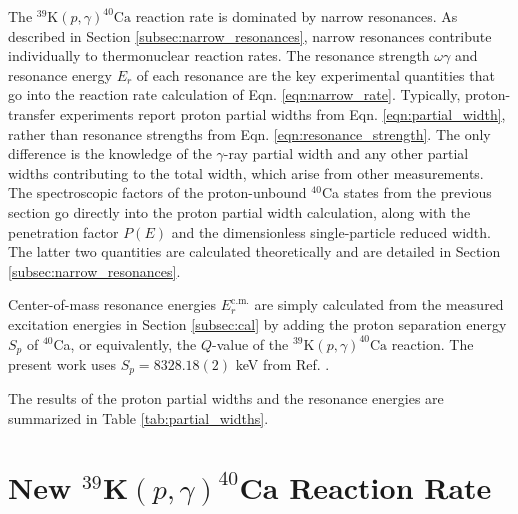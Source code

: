 
The $^{39}\mathrm{K}(p,\gamma)^{40}\mathrm{Ca}$ reaction rate is dominated by narrow resonances. As described in Section \ref{subsec:narrow_resonances}, narrow resonances contribute individually to thermonuclear reaction rates. The resonance strength $\omega\gamma$ and resonance energy $E_{r}$ of each resonance are the key experimental quantities that go into the reaction rate calculation of Eqn. \ref{eqn:narrow_rate}. Typically, proton-transfer experiments report proton partial widths from Eqn. \ref{eqn:partial_width}, rather than resonance strengths from Eqn. \ref{eqn:resonance_strength}. The only difference is the knowledge of the $\gamma$-ray partial width and any other partial widths contributing to the total width, which arise from other measurements. The spectroscopic factors of the proton-unbound $^{40}$Ca states from the previous section go directly into the proton partial width calculation, along with the penetration factor $P(E)$ and the dimensionless single-particle reduced width. The latter two quantities are calculated theoretically and are detailed in Section \ref{subsec:narrow_resonances}.

Center-of-mass resonance energies $E_{r}^{\mathrm{c.m.}}$ are simply calculated from the measured excitation energies in Section \ref{subsec:cal} by adding the proton separation energy $S_{p}$ of $^{40}$Ca, or equivalently, the $Q$-value of the $^{39}\mathrm{K}(p, \gamma)^{40}\mathrm{Ca}$ reaction. The present work uses $S_{p} = 8328.18(2)$ keV from Ref. \cite{Wang2021}.

The results of the proton partial widths and the resonance energies are summarized in Table \ref{tab:partial_widths}.


\section{New $^{39}\mathrm{\textbf{K}}(p,\gamma)^{40}\mathrm{\textbf{Ca}}$ Reaction Rate} \label{sec:pg_reac_rate}


